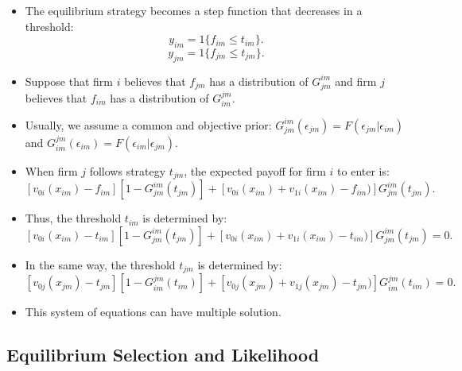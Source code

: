 \documentclass[
]{book}
\providecommand{\tightlist}{%
  \setlength{\itemsep}{0pt}\setlength{\parskip}{0pt}}
\begin{document}
\begin{itemize}
\tightlist
\item
  The equilibrium strategy becomes a step function that decreases in a threshold:
  \[
  y_{im} = 1\{f_{im} \le t_{im}\}.
  \]
  \[
  y_{jm} = 1\{f_{jm} \le t_{jm}\}.
  \]
\item
  Suppose that firm \(i\) believes that \(f_{jm}\) has a distribution of \(G_{jm}^{im}\) and firm \(j\) believes that \(f_{im}\) has a distribution of \(G_{im}^{jm}\).
\item
  Usually, we assume a common and objective prior: \(G_{jm}^{im}(\epsilon_{jm}) = F(\epsilon_{jm}|\epsilon_{im})\) and \(G_{im}^{jm}(\epsilon_{im}) = F(\epsilon_{im}|\epsilon_{jm})\).
\item
  When firm \(j\) follows strategy \(t_{jm}\), the expected payoff for firm \(i\) to enter is:
  \[
  [v_{0i}(x_{im}) - f_{im}][1 - G_{jm}^{im}(t_{jm})] + [v_{0i}(x_{im}) + v_{1i}(x_{im}) - f_{im})] G_{jm}^{im}(t_{jm}).
  \]
\item
  Thus, the threshold \(t_{im}\) is determined by:
  \[
  [v_{0i}(x_{im}) - t_{im}][1 - G_{jm}^{im}(t_{jm})] + [v_{0i}(x_{im}) + v_{1i}(x_{im}) - t_{im})] G_{jm}^{im}(t_{jm}) = 0.
  \]
\item
  In the same way, the threshold \(t_{jm}\) is determined by:
  \[
  [v_{0j}(x_{jm}) - t_{jm}][1 - G_{im}^{jm}(t_{im})] + [v_{0j}(x_{jm}) + v_{1j}(x_{jm}) - t_{jm})] G_{im}^{jm}(t_{im}) = 0.
  \]
\item
  This system of equations can have multiple solution.
\end{itemize}

\hypertarget{equilibrium-selection-and-likelihood}{%
\subsection{Equilibrium Selection and Likelihood}\label{equilibrium-selection-and-likelihood}}
\end{document}
